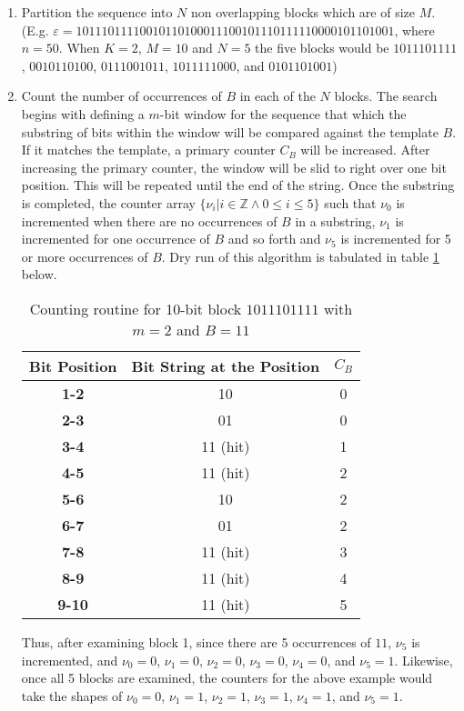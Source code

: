 \begin{enumerate}
    \item Partition the sequence into $N$ non overlapping blocks which are of size $M$. (E.g.  $\varepsilon=10111011110010110100011100101110111110000101101001$, where $n = 50$. When $K = 2$, $M = 10$ and $N = 5$ the five blocks would be $1011101111$, $0010110100$, $0111001011$, $1011111000$, and $0101101001$)
    
    \item Count the number of occurrences of $B$ in each of the $N$ blocks. The search begins with defining a $m$-bit window for the sequence that which the substring of bits within the window will be compared against the template $B$. If it matches the template, a primary counter $C_B$ will be increased. After increasing the primary counter, the window will be slid to right over one bit position. This will be repeated until the end of the string. Once the substring is completed, the counter array $\{\nu_i|i \in \mathbb{Z} \land 0 \leq i \leq 5\}$ such that $\nu_0$ is incremented when there are no occurrences of $B$ in a substring, $\nu_1$ is incremented for one occurrence of $B$ and so forth and $\nu_5$ is incremented for 5 or more occurrences of $B$. Dry run of this algorithm is tabulated in table \ref{tab:bit_wind_21050} below.
    
    \begin{table}[]
        \centering
        \begin{tabular}{|c|c|c|}
        \hline
        \textbf{Bit Position} & \textbf{Bit String at the Position} & \textbf{$C_B$} \\ \hline
        \textbf{1-2} & 10 & 0 \\ \hline
        \textbf{2-3} & 01 & 0 \\ \hline
        \textbf{3-4} & 11 (hit) & 1 \\ \hline
        \textbf{4-5} & 11 (hit) & 2 \\ \hline
        \textbf{5-6} & 10 & 2 \\ \hline
        \textbf{6-7} & 01 & 2 \\ \hline
        \textbf{7-8} & 11 (hit) & 3 \\ \hline
        \textbf{8-9} & 11 (hit) & 4 \\ \hline
        \textbf{9-10} & 11 (hit) & 5 \\ \hline
        \end{tabular}
        \caption{Counting routine for 10-bit block $1011101111$ with $m=2$ and $B=11$}
        \label{tab:bit_wind_21050}
    \end{table}
    Thus, after examining block 1, since there are 5 occurrences of $11$, $\nu_5$ is incremented, and $\nu_0 = 0$, $\nu_1 = 0$, $\nu_2 = 0$, $\nu_3 = 0$, $\nu_4 = 0$, and $\nu_5 = 1$. Likewise, once all 5 blocks are examined, the counters for the above example would take the shapes of $\nu_0 = 0$, $\nu_1 = 1$, $\nu_2 = 1$, $\nu_3 = 1$, $\nu_4 = 1$, and $\nu_5 = 1$.
    

\end{enumerate}
